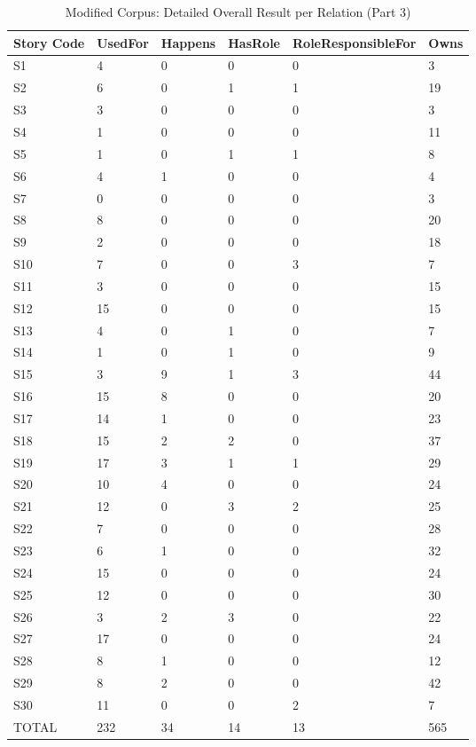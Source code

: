 \begin{table}[H]   %
\centering
\caption{Modified Corpus: Detailed Overall Result per Relation (Part 3)} \vspace{0.25em}
\begin{tabular}{|l|l|l|l|l|l|} \hline
\textbf{Story Code} & \textbf{UsedFor} & \textbf{Happens} & \textbf{HasRole} & \textbf{RoleResponsibleFor} & \textbf{Owns} \\ \hline
S1 & 4 & 0 & 0 & 0 & 3 \\ \hline
S2 & 6 & 0 & 1 & 1 & 19 \\ \hline
S3 & 3 & 0 & 0 & 0 & 3 \\ \hline
S4 & 1 & 0 & 0 & 0 & 11 \\ \hline
S5 & 1 & 0 & 1 & 1 & 8 \\ \hline
S6 & 4 & 1 & 0 & 0 & 4 \\ \hline
S7 & 0 & 0 & 0 & 0 & 3 \\ \hline
S8 & 8 & 0 & 0 & 0 & 20 \\ \hline
S9 & 2 & 0 & 0 & 0 & 18 \\ \hline
S10 & 7 & 0 & 0 & 3 & 7 \\ \hline
S11 & 3 & 0 & 0 & 0 & 15 \\ \hline
S12 & 15 & 0 & 0 & 0 & 15 \\ \hline
S13 & 4 & 0 & 1 & 0 & 7 \\ \hline
S14 & 1 & 0 & 1 & 0 & 9 \\ \hline
S15 & 3 & 9 & 1 & 3 & 44 \\ \hline
S16 & 15 & 8 & 0 & 0 & 20 \\ \hline
S17 & 14 & 1 & 0 & 0 & 23 \\ \hline
S18 & 15 & 2 & 2 & 0 & 37 \\ \hline
S19 & 17 & 3 & 1 & 1 & 29 \\ \hline
S20 & 10 & 4 & 0 & 0 & 24 \\ \hline
S21 & 12 & 0 & 3 & 2 & 25 \\ \hline
S22 & 7 & 0 & 0 & 0 & 28 \\ \hline
S23 & 6 & 1 & 0 & 0 & 32 \\ \hline
S24 & 15 & 0 & 0 & 0 & 24 \\ \hline
S25 & 12 & 0 & 0 & 0 & 30 \\ \hline
S26 & 3 & 2 & 3 & 0 & 22 \\ \hline
S27 & 17 & 0 & 0 & 0 & 24 \\ \hline
S28 & 8 & 1 & 0 & 0 & 12 \\ \hline
S29 & 8 & 2 & 0 & 0 & 42 \\ \hline
S30 & 11 & 0 & 0 & 2 & 7 \\ \hline
TOTAL & 232 & 34 & 14 & 13 & 565 \\ \hline
\end{tabular}
\label{tab:mod3}
\end{table}

